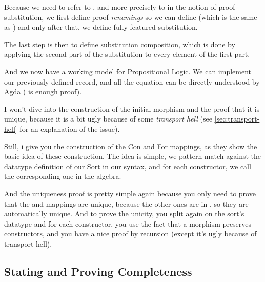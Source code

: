 \documentclass[10pt,a4paper]{article}
\begin{document}
			Because we need to refer to , and more precisely to   in the notion of proof substitution, we first define proof \emph{renamings} so we can define  (which is the same as  ) and only after that, we define fully featured substitution.
			
			\begin{tcolorbox}
				\agdasep
			\end{tcolorbox}
		
			The last step is then to define substitution composition, which is done by applying the second part of the substitution to every element of the first part.
		
			\begin{tcolorbox}
				\agda{agda/ZOL-I-11.tex}
			\end{tcolorbox}
			
			And we now have a working model for Propositional Logic. We can implement our previously defined record, and all the equation can be directly understood by Agda ( is enough proof).
			
			I won't dive into the construction of the initial morphism and the proof that it is unique, because it is a bit ugly because of some \emph{transport hell} (see \autoref{sec:transport-hell} for an explanation of the issue).
			
			Still, i give you the construction of the Con and For mappings, as they show the basic idea of these construction. The idea is simple, we pattern-match against the datatype definition of our Sort in our syntax, and for each constructor, we call the corresponding one in the algebra.
			
			And the uniqueness proof is pretty simple again because you only need to prove that the  and  mappings are unique, because the other ones are in , so they are automatically unique. And to prove the unicity, you split again on the sort's datatype and for each constructor, you use the fact that a morphism preserves constructors, and you have a nice proof by recursion (except it's ugly because of transport hell).
			
			\begin{tcolorbox}
				\agda{agda/ZOL-I-13.tex}
			\end{tcolorbox}
				
		\subsection{Stating and Proving Completeness}
		
\end{document}
